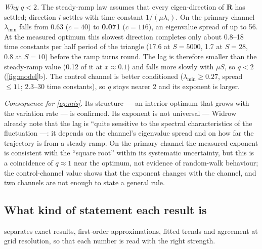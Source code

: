\begin{newtext}
\emph{Why $q<2$.} The steady-ramp law assumes that every eigen-direction of $\mathbf R$ has settled; direction $i$ settles with time constant $1/(\mu\lambda_i)$. On the primary channel $\lambda_{\min}$ falls from 0.63 ($c=40$) to \textbf{0.071} ($c=116$), an eigenvalue spread of up to 56. At the measured optimum this slowest direction completes only about 0.8--18 time constants per half period of the triangle (17.6 at $S=5000$, 1.7 at $S=28$, 0.8 at $S=10$) before the ramp turns round. The lag is therefore smaller than the steady-ramp value (0.12 of it at $x\approx0.1$) and falls more slowly with $\mu S$, so $q<2$ (\cref{fig:model}b). The control channel is better conditioned ($\lambda_{\min}\ge0.27$, spread $\le11$; 2.3--30 time constants), so $q$ stays nearer 2 and its exponent is larger.

\emph{Consequence for \eqref{eq:mis}.} Its structure --- an interior optimum that grows with the variation rate --- is confirmed. Its exponent is not universal --- Widrow \etal already note that the lag is ``quite sensitive to the spectral characteristics of the fluctuation \cite[footnote~4]{widrow1976} ---: it depends on the channel's eigenvalue spread and on how far the trajectory is from a steady ramp. On the primary channel the measured exponent is consistent with the ``square root'' within its systematic uncertainty, but this is a coincidence of $q\approx1$ near the optimum, not evidence of random-walk behaviour; the control-channel value shows that the exponent changes with the channel, and two channels are not enough to state a general rule.

\subsection{What kind of statement each result is}
 separates exact results, first-order approximations, fitted trends and agreement at grid resolution, so that each number is read with the right strength.


\end{newtext}
